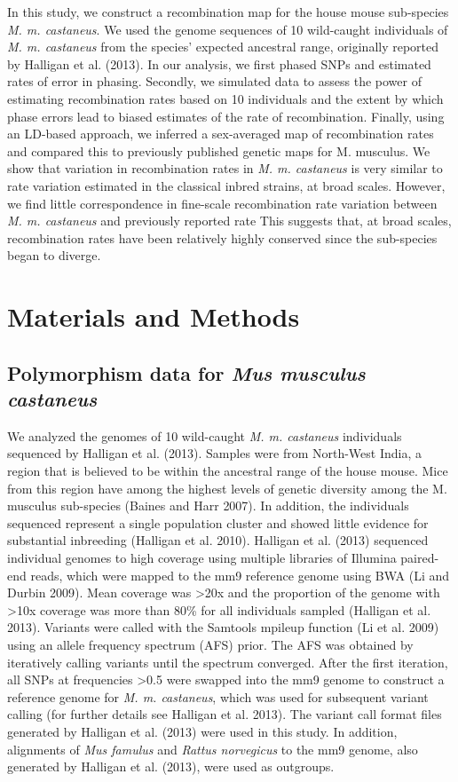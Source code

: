 In this study, we construct a recombination map for the house mouse sub-species \emph{M. m. castaneus}. We used the genome sequences of 10 wild-caught individuals of \emph{M. m. castaneus} from the species’ expected ancestral range, originally reported by Halligan et al. (2013). In our analysis, we first phased SNPs and estimated rates of error in phasing. Secondly, we simulated data to assess the power of estimating recombination rates based on 10 individuals and the extent by which phase errors lead to biased estimates of the rate of recombination. Finally, using an LD-based approach, we inferred a sex-averaged map of recombination rates and compared this to previously published genetic maps for M. musculus. We show that variation in recombination rates in \emph{M. m. castaneus} is very similar to rate variation estimated in the classical inbred strains, at broad scales. However, we find little correspondence in fine-scale recombination rate variation between \emph{M. m. castaneus} and previously reported rate This suggests that, at broad scales, recombination rates have been relatively highly conserved since the sub-species began to diverge.

\section{Materials and Methods}

\subsection{Polymorphism data for \emph{Mus musculus castaneus}}
 
        	We analyzed the genomes of 10 wild-caught \emph{M. m. castaneus} individuals sequenced by Halligan et al. (2013). Samples were from North-West India, a region that is believed to be within the ancestral range of the house mouse. Mice from this region have among the highest levels of genetic diversity among the M. musculus sub-species (Baines and Harr 2007). In addition, the individuals sequenced represent a single population cluster and showed little evidence for substantial inbreeding (Halligan et al. 2010). Halligan et al. (2013) sequenced individual genomes to high coverage using multiple libraries of Illumina paired-end reads, which were mapped to the mm9 reference genome using BWA (Li and Durbin 2009). Mean coverage was >20x and the proportion of the genome with >10x coverage was more than 80\% for all individuals sampled (Halligan et al. 2013). Variants were called with the Samtools mpileup function (Li et al. 2009) using an allele frequency spectrum (AFS) prior. The AFS was obtained by iteratively calling variants until the spectrum converged. After the first iteration, all SNPs at frequencies >0.5 were swapped into the mm9 genome to construct a reference genome for \emph{M. m. castaneus}, which was used for subsequent variant calling (for further details see Halligan et al. 2013). The variant call format files generated by Halligan et al. (2013) were used in this study. In addition, alignments of \emph{Mus famulus} and \emph{Rattus norvegicus} to the mm9 genome, also generated by Halligan et al. (2013), were used as outgroups.
 
